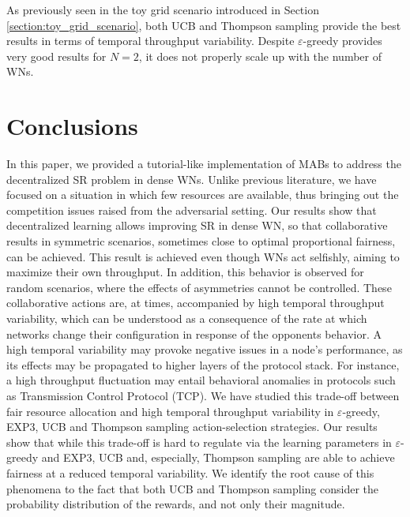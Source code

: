 \documentclass[preprint,12pt]{elsarticle}
\begin{document}
As previously seen in the toy grid scenario introduced in Section \ref{section:toy_grid_scenario}, both UCB and Thompson sampling provide the best results in terms of temporal throughput variability. Despite $\varepsilon$-greedy provides very good results for $N=2$, it does not properly scale up with the number of WNs.   

\section{Conclusions }
\label{section:conclusions}
In this paper, we provided a tutorial-like implementation of MABs to address the decentralized SR problem in dense WNs. Unlike previous literature, we have focused on a situation in which few resources are available, thus bringing out the competition issues raised from the adversarial setting. Our results show that decentralized learning allows improving SR in dense WN, so that collaborative results in symmetric scenarios, sometimes close to optimal proportional fairness, can be achieved. This result is achieved even though WNs act selfishly, aiming to maximize their own throughput. In addition, this behavior is observed for random scenarios, where the effects of asymmetries cannot be controlled. %
These collaborative actions are, at times, accompanied by high temporal throughput variability, which can be understood as a consequence of the  rate at which networks change their configuration in response of the opponents behavior. A high temporal variability may provoke negative issues in a node's performance, as its effects may be propagated to higher layers of the protocol stack. For instance, a high throughput fluctuation may entail behavioral anomalies in protocols such as Transmission Control Protocol (TCP). %
We have studied this trade-off between fair resource allocation and high temporal throughput variability in $\varepsilon$-greedy, EXP3, UCB and Thompson sampling action-selection strategies. Our results show that while this trade-off is hard to regulate via the learning parameters in $\varepsilon$-greedy and EXP3, UCB  and, especially, Thompson sampling are able to achieve fairness at a reduced temporal variability. We identify the root cause of this phenomena to the fact that both UCB and Thompson sampling consider the probability distribution of the rewards, and not only their magnitude.
\end{document}
